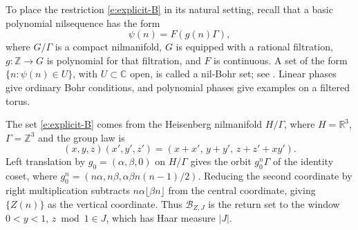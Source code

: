\documentclass[12pt]{amsart}
\newcommand{\1}{\mathbf 1}
\theoremstyle{definition}
\begin{document}

\bigskip

To place the restriction \eqref{e:explicit-B} in its natural setting, recall that a basic
polynomial nilsequence has the form
\[
 \psi(n)=F(g(n)\Gamma),
\]
where $G/\Gamma$ is a compact nilmanifold, $G$ is equipped with a
rational filtration, $g:\mathbb Z\to G$ is polynomial for that
filtration, and $F$ is continuous. A set of the form
$\{n:\psi(n)\in U\}$, with $U\subset\mathbb C$ open, is called a
nil-Bohr set; see \cite[Definitions~1.1 and~2.2]{ShaoTeravainen}.
Linear phases give ordinary Bohr conditions, and polynomial phases
give examples on a filtered torus.

The set \eqref{e:explicit-B} comes from the Heisenberg nilmanifold
$H/\Gamma$, where $H=\mathbb R^3$, $\Gamma=\mathbb Z^3$ and the
group law is
\[
 (x,y,z)(x',y',z')=(x+x',\,y+y',\,z+z'+xy').
\]
Left translation by $g_0=(\alpha,\beta,0)$ on $H/\Gamma$ gives
the orbit $g_0^n\Gamma$ of the identity coset, where
$g_0^n=(n\alpha,n\beta,\alpha\beta n(n-1)/2)$. Reducing the second
coordinate by right multiplication subtracts
$n\alpha\lfloor\beta n\rfloor$ from the central coordinate, giving
$\{Z(n)\}$ as the vertical coordinate. Thus $\mathcal B_{Z,J}$
is the return set to the window $0<y<1$, $z\bmod 1\in J$,
which has Haar measure $|J|$.


\end{document}
